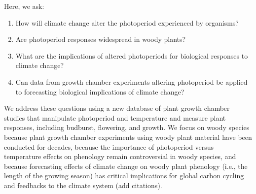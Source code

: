 \documentclass{article}
\begin{document}
\par Here, we ask: 
\begin{enumerate}
\item How will climate change alter the photoperiod experienced by organisms? %
\item Are photoperiod responses widespread in woody plants? %
\item What are the implications of altered photoperiods for biological responses to climate change?
\item Can data from growth chamber experiments altering photoperiod be applied to forecasting biological implications of climate change?

\end{enumerate}
\par We address these questions using a new database of plant growth chamber studies that manipulate photoperiod and temperature and measure plant responses, including budburst, flowering, and growth.  %
We focus on woody species because plant growth chamber experiments using woody plant material have been conducted for decades, because the importance of photoperiod versus temperature effects on phenology remain controversial in woody species, and because forecasting effects of climate change on woody plant phenology (i.e., the length of the growing season) has critical implications for global carbon cycling and feedbacks to the climate system (add citations). 
\end{document}
